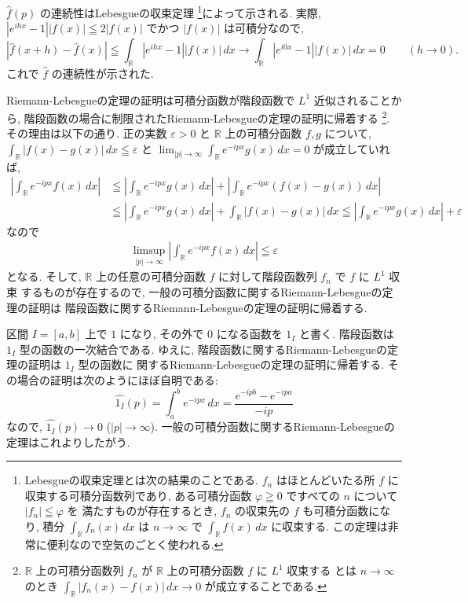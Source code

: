 \documentclass[12pt,twoside]{jarticle}
\newcommand\R{{\mathbb R}} %
\newcommand\eps{\varepsilon}
\theoremstyle{jplain}
\theoremstyle{jplain}
\theoremstyle{jplain}
\numberwithin{theorem}{section}
\numberwithin{equation}{section}
\numberwithin{figure}{section}
\numberwithin{table}{section}
\begin{document}
$\hat{f}(p)$ の連続性はLebesgueの収束定理%
\footnote{Lebesgueの収束定理とは次の結果のことである.
$f_n$ はほとんどいたる所 $f$ に収束する可積分函数列であり, 
ある可積分函数 $\varphi\geqq 0$ ですべての $n$ について $|f_n|\leqq\varphi$ を
満たすものが存在するとき, 
$f_n$ の収束先の $f$ も可積分函数になり, 
積分 $\int_\R f_n(x)\,dx$ は $n\to\infty$ で
$\int_\R f(x)\,dx$ に収束する.
この定理は非常に便利なので空気のごとく使われる.}によって示される.
実際, $|e^{ihx}-1||f(x)|\leqq 2|f(x)|$ でかつ $|f(x)|$ は可積分なので, 
\[
|\widehat{f}(x+h)-\widehat{f}(x)|
\leqq\int_\R|e^{ihx}-1||f(x)|\,dx
\longrightarrow
\int_\R|e^{i0x}-1||f(x)|\,dx = 0
\qquad(h\to 0).
\]
これで $\hat{f}$ の連続性が示された.

Riemann-Lebesgueの定理の証明は可積分函数が階段函数で $L^1$ 近似されることから, 
階段函数の場合に制限されたRiemann-Lebesgueの定理の証明に帰着する%
\footnote{$\R$ 上の可積分函数列 $f_n$ が $\R$ 上の可積分函数 $f$ に $L^1$ 収束する
とは $n\to\infty$ のとき $\int_\R |f_n(x)-f(x)|\,dx\to 0$ が成立することである.}.
その理由は以下の通り.
正の実数 $\eps>0$ と $\R$ 上の可積分函数 $f,g$ について, 
$\int_\R|f(x)-g(x)|\,dx\leqq\eps$ と $\lim_{|p|\to\infty}\int_\R e^{-ipx}g(x)\,dx=0$
が成立していれば, 
\begin{align*}
\left|\int_\R e^{-ipx}f(x)\,dx\right|
&\leqq
\left|\int_\R e^{-ipx}g(x)\,dx\right|
+ \left|\int_\R e^{-ipx}(f(x)-g(x))\,dx\right|
\\ &
\leqq
\left|\int_\R e^{-ipx}g(x)\,dx\right| + \int_\R|f(x)-g(x)|\,dx
\leqq
\left|\int_\R e^{-ipx}g(x)\,dx\right| + \eps
\end{align*}
なので
\begin{align*}
\limsup_{|p|\to\infty}\left|\int_\R e^{-ipx}f(x)\,dx\right| \leqq \eps
\end{align*}
となる. 
そして, $\R$ 上の任意の可積分函数 $f$ に対して階段函数列 $f_n$ で $f$ に $L^1$ 収束
するものが存在するので, 一般の可積分函数に関するRiemann-Lebesgueの定理の証明は
階段函数に関するRiemann-Lebesgueの定理の証明に帰着する.

区間 $I=[a,b]$ 上で $1$ になり, 
その外で $0$ になる函数を $1_I$ と書く.
階段函数は $1_I$ 型の函数の一次結合である. 
ゆえに, 階段函数に関するRiemann-Lebesgueの定理の証明は $1_I$ 型の函数に
関するRiemann-Lebesgueの定理の証明に帰着する. 
その場合の証明は次のようにほぼ自明である:
\[
\widehat{1_I}(p) 
= \int_a^b e^{-ipx}\,dx
= \frac{e^{-ipb}-e^{-ipa}}{-ip}
\]
なので, $\widehat{1_I}(p)\to 0$ ($|p|\to\infty$). 
一般の可積分函数に関するRiemann-Lebesgueの定理はこれよりしたがう.
\end{document}
